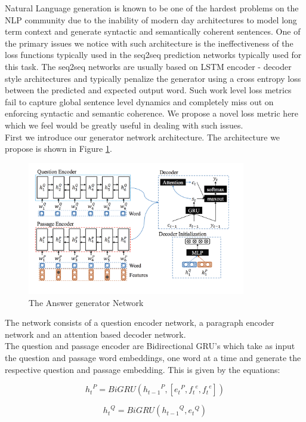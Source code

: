 Natural Language generation is known to be one of the hardest problems on the NLP community due to the inability of modern day architectures to model long term context and generate syntactic and semantically coherent sentences. One of the primary issues we notice with such architecture is the ineffectiveness of the loss functions typically used in the seq2seq prediction networks typically used for this task. The seq2seq networks are usually based on LSTM encoder - decoder style architectures and typically penalize the generator using a cross entropy loss between the predicted and expected output word. Such work level loss metrics fail to capture global sentence level dynamics and completely miss out on enforcing syntactic and semantic coherence. We propose a novel loss metric here which we feel would be greatly useful in dealing with such issues.\\

First we introduce our generator network architecture. The architecture we propose is shown in Figure \ref{im:im_gen}.
\begin{figure}[h]
    \centering
    \includegraphics[width=0.85\textwidth]{images/ans_net.png}
    \caption{The Answer generator Network}
    \label{im:im_gen}
\end{figure}

The network consists of a question encoder network, a paragraph encoder network and an attention based decoder network.\\
The question and passage encoder are Bidirectional GRU's which take as input the question and passage word embeddings, one word at a time and generate the respective question and passage embedding. This is given by the equations:

\[ {h_t}^P = BiGRU({h_{t-1}}^P, [{e_t}^P, {f_t}^e, {f_t}^e]) \]

\[{h_t}^Q = BiGRU({h_{t-1}}^Q, {e_t}^Q) \]

